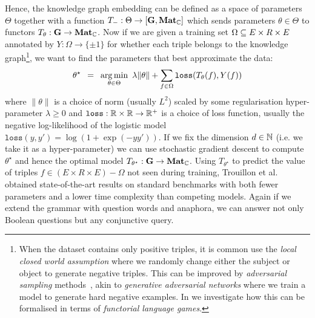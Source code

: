 Hence, the knowledge graph embedding can be defined as a space of parameters $\Theta$ together with a function $T_- : \Theta \to [\mathbf{G}, \mathbf{Mat}_{\mathbb{C}}]$ which sends parameters $\theta \in \Theta$ to functors $T_\theta : \mathbf{G} \to \mathbf{Mat}_{\mathbb{C}}$.
Now if we are given a training set $\Omega \subseteq E \times R \times E$ annotated by $Y : \Omega \to \{ \pm 1 \}$ for whether each triple belongs to the knowledge graph\footnote
{When the dataset contains only positive triples, it is common use the \emph{local closed world assumption} where we randomly change either the subject or object to generate negative triples.
This can be improved by \emph{adversarial sampling} methods~\cite{CaiWang18}, akin to \emph{generative adversarial networks} where we train a model to generate hard negative examples.
In \cite{FeliceEtAl20} we investigate how this can be formalised in terms of \emph{functorial language games}.},
we want to find the parameters that best approximate the data:
$$
\theta^\star \enspace = \enspace \operatorname*{arg\,min}_{\theta \in \Theta} \
\lambda \lVert \theta \rVert + \sum_{f \in \Omega} \mathtt{loss}(T_\theta(f), Y(f))
$$
where $\lVert \theta \rVert$ is a choice of norm (usually $L^2$) scaled by some regularisation hyper-parameter $\lambda \geq 0$ and $\mathtt{loss} : \mathbb{R} \times \mathbb{R} \to \mathbb{R}^+$ is a choice of loss function, usually the negative log-likelihood of the logistic model $\mathtt{loss}(y, y') = \log (1 + \exp(-yy'))$.
If we fix the dimension $d \in \mathbb{N}$ (i.e. we take it as a hyper-parameter) we can use stochastic gradient descent to compute $\theta^\star$ and hence the optimal model $T_{\theta^\star} : \mathbf{G} \to \mathbf{Mat}_{\mathbb{C}}$.
Using $T_{\theta^\star}$ to predict the value of triples $f \in (E \times R \times E) - \Omega$ not seen during training, Trouillon et al.~\cite{TrouillonEtAl16} obtained state-of-the-art results on standard benchmarks with both fewer parameters and a lower time complexity than competing models.
Again if we extend the grammar with question words and anaphora, we can answer not only Boolean questions but any conjunctive query.

